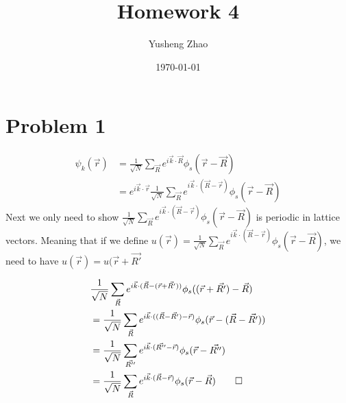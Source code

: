 \documentclass[11pt]{article}
\author{Yusheng Zhao}
\date{\today}
\title{Homework 4}
\begin{document}
\maketitle
\tableofcontents


\section{Problem 1}
\label{sec:org1f8acab}
\begin{align}
\psi_{k}(\vec{r}) & = \frac{1}{\sqrt{N}} \sum_{\vec{R}} e^{i\vec{k}\cdot\vec{R}} \phi_{s}(\vec{r} - \vec{R}) \\
& = e^{i\vec{k}\cdot\vec{r}} \frac{1}{\sqrt{N}} \sum_{\vec{R}} e^{i\vec{k}\cdot(\vec{R}- \vec{r})} \phi_{s}(\vec{r} - \vec{R})
\end{align}
Next we only need to show \(\frac{1}{\sqrt{N}} \sum_{\vec{R}}
e^{i\vec{k}\cdot(\vec{R}- \vec{r})} \phi_{s}(\vec{r} - \vec{R})\) is periodic in
lattice vectors. Meaning that if we define \(u(\vec{r}) = \frac{1}{\sqrt{N}}
\sum_{\vec{R}} e^{i\vec{k}\cdot(\vec{R}- \vec{r})} \phi_{s}(\vec{r} -
\vec{R})\), we need to have \(u(\vec{r}) = u(\vec{r}+\vec{R'}\)

\begin{align}
& \frac{1}{\sqrt{N}} \sum_{\vec{R}} e^{i\vec{k}\cdot(\vec{R}- (\vec{r}+\vec{R'}))} \phi_{s}((\vec{r}+\vec{R'}) - \vec{R}) \\
& = \frac{1}{\sqrt{N}} \sum_{\vec{R}} e^{i\vec{k}\cdot((\vec{R}- \vec{R'}) - \vec{r})} \phi_{s}(\vec{r}- (\vec{R} - \vec{R'})) \\
& = \frac{1}{\sqrt{N}} \sum_{\vec{R''}} e^{i\vec{k}\cdot(\vec{R''}- \vec{r})} \phi_{s}(\vec{r}- \vec{R''}) \\
& = \frac{1}{\sqrt{N}} \sum_{\vec{R}} e^{i\vec{k}\cdot(\vec{R}- \vec{r})} \phi_{s}(\vec{r}- \vec{R}) \qed
\end{align}
\end{document}
